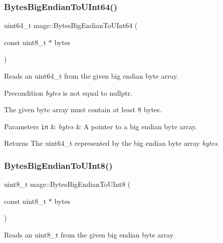 \subsubsection{\texorpdfstring{Bytes\+Big\+Endian\+To\+U\+Int64()}{BytesBigEndianToUInt64()}}
{\footnotesize\ttfamily uint64\+\_\+t mage\+::\+Bytes\+Big\+Endian\+To\+U\+Int64 (\begin{DoxyParamCaption}\item[{const uint8\+\_\+t $\ast$}]{bytes }\end{DoxyParamCaption})\hspace{0.3cm}{\ttfamily [noexcept]}}

Reads an uint64\+\_\+t from the given big endian byte array.

\begin{DoxyPrecond}{Precondition}
{\itshape bytes} is not equal to {\ttfamily nullptr}. 

The given byte array must contain at least 8 bytes. 
\end{DoxyPrecond}

\begin{DoxyParams}[1]{Parameters}
\mbox{\tt in}  & {\em bytes} & A pointer to a big endian byte array. \\
\hline
\end{DoxyParams}
\begin{DoxyReturn}{Returns}
The {\ttfamily uint64\+\_\+t} represented by the big endian byte array {\itshape bytes}. 
\end{DoxyReturn}
\hypertarget{namespacemage_a372cbb208a8853b9ac186436b06912fc}{}\label{namespacemage_a372cbb208a8853b9ac186436b06912fc} 
\subsubsection{\texorpdfstring{Bytes\+Big\+Endian\+To\+U\+Int8()}{BytesBigEndianToUInt8()}}
{\footnotesize\ttfamily uint8\+\_\+t mage\+::\+Bytes\+Big\+Endian\+To\+U\+Int8 (\begin{DoxyParamCaption}\item[{const uint8\+\_\+t $\ast$}]{bytes }\end{DoxyParamCaption})\hspace{0.3cm}{\ttfamily [noexcept]}}

Reads an uint8\+\_\+t from the given big endian byte array.

